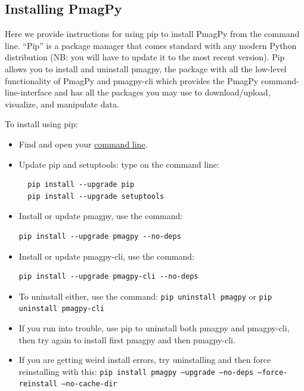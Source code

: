 \documentclass[11pt]{book}
\begin{document}
{%

 \subsection{Installing PmagPy}

 Here we provide instructions for using pip to install PmagPy from the command line.
       ``Pip'' is a package manager that comes standard with any modern Python distribution (NB: you will have to update it to the most recent version).  Pip allows you to install and uninstall pmagpy, the package with all the low-level functionality of PmagPy and pmagpy-cli which provides the PmagPy command-line-interface and has all the packages you may use to download/upload, visualize, and manipulate data.


  To install using pip:

  \begin{itemize}
     \item Find  and open your \href{#command_line}{command line}.
     \item Update pip and setuptools: type on  the command line: \begin{verbatim}
  pip install --upgrade pip
  pip install --upgrade setuptools\end{verbatim}
     \item Install or update pmagpy, use the command: \begin{verbatim}pip install --upgrade pmagpy --no-deps \end{verbatim}
     \item Install or update pmagpy-cli, use the command: \begin{verbatim}pip install --upgrade pmagpy-cli --no-deps \end{verbatim}
     \item To uninstall either, use the command: \texttt{pip uninstall pmagpy} or \texttt{pip uninstall pmagpy-cli}
     \item If you run into trouble, use pip to uninstall both pmagpy and pmagpy-cli, then try again to install first pmagpy and then pmagpy-cli.
     \item If you are getting weird install errors, try uninstalling and then force reinstalling with this: \texttt{pip install pmagpy --upgrade --no-deps --force-reinstall --no-cache-dir}
   \end{itemize}

}
\end{document}
